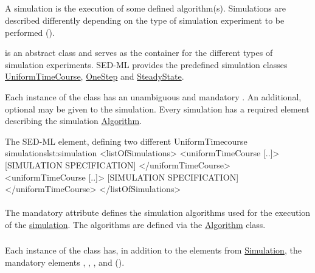 \subsection{}
\label{class:simulation}
A simulation is the execution of some defined algorithm(s). Simulations are described differently depending on the type of simulation experiment to be performed (). 


 is an abstract class and serves as the container for the different types of simulation experiments. SED-ML \currentLV provides the predefined simulation classes \hyperref[class:uniformTimeCourse]{UniformTimeCourse}, \hyperref[class:oneStep]{OneStep} and \hyperref[class:steadyState]{SteadyState}. 

Each instance of the  class has an unambiguous and mandatory \hyperref[sec:id]{}. An additional, optional \hyperref[sec:name]{} may be given to the simulation. Every simulation has a required element \hyperref[sec:algorithm]{} describing the simulation \hyperref[class:algorithm]{Algorithm}.

\begin{myXmlLst}{The SED-ML  element, defining two different UniformTimecourse simulations}{lst:simulation}
<listOfSimulations>
	<uniformTimeCourse [..]>
		[SIMULATION SPECIFICATION]
	</uniformTimeCourse>
	<uniformTimeCourse [..]>
		[SIMULATION SPECIFICATION]
	</uniformTimeCourse>
</listOfSimulations>
\end{myXmlLst}

\paragraph*{}
\label{sec:algorithm}
The mandatory attribute  defines the simulation algorithms used for the execution of the \hyperref[class:simulation]{simulation}. The algorithms are defined via the \hyperref[class:algorithm]{Algorithm} class.


\subsubsection{}
\label{class:uniformTimeCourse}
Each instance of the  class has, in addition to the elements from \hyperref[class:simulation]{Simulation}, the mandatory elements \hyperref[sec:initialTime]{}, \hyperref[sec:outputStartTime]{}, \hyperref[sec:outputEndTime]{}, and \hyperref[sec:numberOfPoints]{} ().

